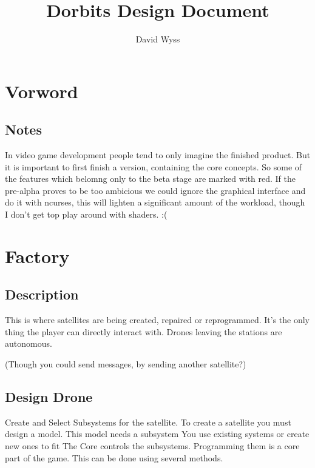 \documentclass[a4paper]{scrreprt}
\title{Dorbits Design Document}
\author{David Wyss}
\begin{document}

\newenvironment{alpha-feature}{\color{alpha-color}}{}

\maketitle
\tableofcontents

\chapter{Vorword}
    \section{Notes}
    In video game development people tend to only imagine the finished product. But it is important to first finish a version, containing the core concepts. So some of the features which belomng only to the beta stage are marked with red. If the pre-alpha proves to be too ambicious we could ignore the graphical interface and do it with ncurses, this will lighten a significant amount of the workload, though I don't get top play around with shaders. :(

\chapter{Factory}
    \section{Description}
        This is where satellites are being created, repaired or reprogrammed. 
        It's the only thing the player can directly interact with.
        Drones leaving the stations are autonomous. \begin{alpha-feature}(Though you could send messages, by sending another satellite?)\end{alpha-feature}
    \section{Design Drone}
        Create and Select Subsystems for the satellite.
        To create a satellite you must design a model. This model needs a subsystem
        You use existing systems or create new ones to fit 
        The Core controls the subsystems. Programming them is a core part of the game. This can be done using several methods.
\end{document}
